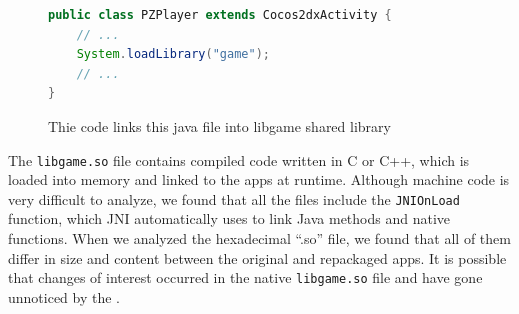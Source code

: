 \begin{figure}[ht]
\centering
{}
\begin{lstlisting}[language=Java]
public class PZPlayer extends Cocos2dxActivity {
    // ...
    System.loadLibrary("game");
    // ...
}
\end{lstlisting}
\caption{Thie code links this java file into libgame shared library}
\label{code:jni}
\end{figure}


The \texttt{libgame.so} file contains compiled code written in C or C++, which is loaded into memory and linked to the apps at runtime. Although machine code is very difficult to analyze, we found that all the files include the \texttt{JNI\underline{\hspace{.1in}}OnLoad} function, which JNI automatically uses to link Java methods and native functions. When we analyzed the hexadecimal ``.so'' file, we found that all of them differ in size and content between the original and repackaged apps. It is possible that changes of interest occurred in the native \texttt{libgame.so} file and have gone unnoticed by the \mas.





 








